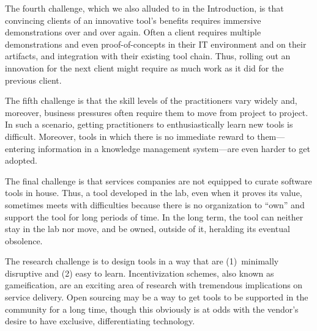 The fourth challenge, which we also alluded to in the Introduction, is that
convincing clients of an innovative tool's benefits requires immersive
demonstrations over and over again. Often a client requires multiple
demonstrations and even proof-of-concepts in their IT environment and on their
artifacts, and integration with their existing tool chain. Thus, rolling out an
innovation for the next client might require as much work as it did for the
previous client.

The fifth challenge is that the skill levels of the practitioners vary widely
and, moreover, business pressures often require them to move from project to
project. In such a scenario, getting practitioners to enthusiastically learn new
tools is difficult.  Moreover, tools in which there is no immediate reward to
them---\eg entering information in a knowledge management system---are even
harder to get adopted.

The final challenge is that services companies are not equipped to curate
software tools in house. Thus, a tool developed in the lab, even when it proves
its value, sometimes meets with difficulties because there is no organization to
``own'' and support the tool for long periods of time. In the long term, the
tool can neither stay in the lab nor move, and be owned, outside of it,
heralding its eventual obsolence.

The research challenge is to design tools in a way that are (1)~minimally
disruptive and (2) easy to learn. Incentivization schemes, also known as
gameification, are an exciting area of research with tremendous implications on
service delivery.  Open sourcing may be a way to get tools to be supported in
the community for a long time, though this obviously is at odds with the
vendor's desire to have exclusive, differentiating technology.
